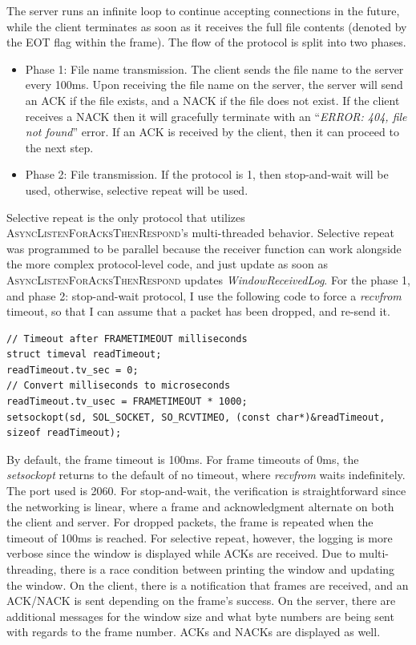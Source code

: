 \documentclass[runningheads]{llncs}
\begin{document}
The server runs an infinite loop to continue accepting connections in the future, while the client terminates as soon as it receives the full file contents (denoted by the EOT flag within the frame). The flow of the protocol is split into two phases.
\begin{itemize}
    \item Phase 1: File name transmission. The client sends the file name to the server every 100ms. Upon receiving the file name on the server, the server will send an ACK if the file exists, and a NACK if the file does not exist. If the client receives a NACK then it will gracefully terminate with an ``\emph{ERROR: 404, file not found}'' error. If an ACK is received by the client, then it can proceed to the next step.
    \item Phase 2: File transmission. If the protocol is 1, then stop-and-wait will be used, otherwise, selective repeat will be used.
\end{itemize}

Selective repeat is the only protocol that utilizes \textsc{AsyncListenForAcksThenRespond}'s multi-threaded behavior. Selective repeat was programmed to be parallel because the receiver function can work alongside the more complex protocol-level code, and just update as soon as \textsc{AsyncListenForAcksThenRespond} updates \emph{WindowReceivedLog}. For the phase 1, and phase 2: stop-and-wait protocol, I use the following code to force a \emph{recvfrom} timeout, so that I can assume that a packet has been dropped, and re-send it.
\begin{lstlisting}
// Timeout after FRAMETIMEOUT milliseconds
struct timeval readTimeout;
readTimeout.tv_sec = 0;
// Convert milliseconds to microseconds
readTimeout.tv_usec = FRAMETIMEOUT * 1000;
setsockopt(sd, SOL_SOCKET, SO_RCVTIMEO, (const char*)&readTimeout, sizeof readTimeout);
\end{lstlisting}
By default, the frame timeout is 100ms. For frame timeouts of 0ms, the \emph{setsockopt} returns to the default of no timeout, where \emph{recvfrom} waits indefinitely.
The port used is 2060. For stop-and-wait, the verification is straightforward since the networking is linear, where a frame and acknowledgment alternate on both the client and server. For dropped packets, the frame is repeated when the timeout of 100ms is reached. For selective repeat, however, the logging is more verbose since the window is displayed while ACKs are received. Due to multi-threading, there is a race condition between printing the window and updating the window. On the client, there is a notification that frames are received, and an ACK/NACK is sent depending on the frame's success. On the server, there are additional messages for the window size and what byte numbers are being sent with regards to the frame number. ACKs and NACKs are displayed as well.
\end{document}

